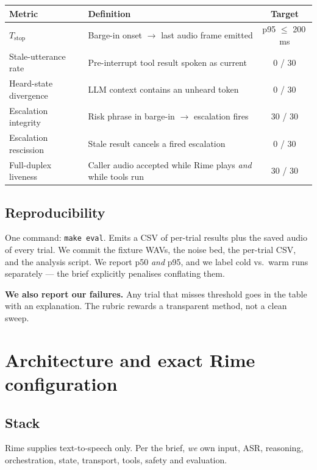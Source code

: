 \documentclass[11pt,a4paper]{article}
\newcommand{\code}[1]{\texttt{\small #1}}
\begin{document}
\begin{center}
\begin{tabular}{@{}p{6.6cm}p{4.3cm}c@{}}
\toprule
\textbf{Metric} & \textbf{Definition} & \textbf{Target} \\
\midrule
$T_{\mathrm{stop}}$ & Barge-in onset $\rightarrow$ last audio frame emitted & p95 $\leq$ 200\,ms \\
Stale-utterance rate & Pre-interrupt tool result spoken as current & 0 / 30 \\
Heard-state divergence & LLM context contains an unheard token & 0 / 30 \\
Escalation integrity & Risk phrase in barge-in $\rightarrow$ escalation fires & 30 / 30 \\
Escalation rescission & Stale result cancels a fired escalation & 0 / 30 \\
Full-duplex liveness & Caller audio accepted while Rime plays \emph{and} while tools run & 30 / 30 \\
\bottomrule
\end{tabular}
\end{center}

\subsection{Reproducibility}

One command: \code{make eval}. Emits a CSV of per-trial results plus the saved audio of
every trial. We commit the fixture WAVs, the noise bed, the per-trial CSV, and the
analysis script. We report p50 \emph{and} p95, and we label cold vs.\ warm runs
separately --- the brief explicitly penalises conflating them.

\vspace{0.3em}
\textbf{We also report our failures.} Any trial that misses threshold goes in the table
with an explanation. The rubric rewards a transparent method, not a clean sweep.

\section{Architecture and exact Rime configuration}

\subsection{Stack}

Rime supplies text-to-speech only. Per the brief, \emph{we} own input, ASR, reasoning,
orchestration, state, transport, tools, safety and evaluation.
\end{document}
